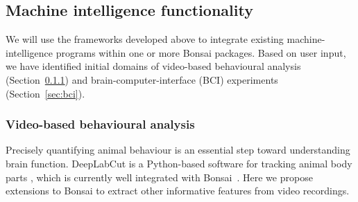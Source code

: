 


%         


\subsection{Machine intelligence functionality}
\label{sec:functionality}

We will use the frameworks developed above to integrate existing machine-intelligence programs within one or more Bonsai packages.  Based on user input, we have identified initial domains of video-based behavioural analysis (Section~\ref{sec:videoBasedBehavioralAnalysis}) and
brain-computer-interface (BCI) experiments (Section~\ref{sec:bci}). 

\subsubsection{Video-based behavioural analysis}
\label{sec:videoBasedBehavioralAnalysis}

Precisely quantifying animal behaviour is an essential step toward understanding
brain function.  DeepLabCut is a Python-based software for tracking animal body
parts \citep{mathisEtAl18}, which is currently well integrated with
Bonsai~\citep{kaneEtAl20}. Here we propose extensions to Bonsai to extract
other informative features from video recordings.

